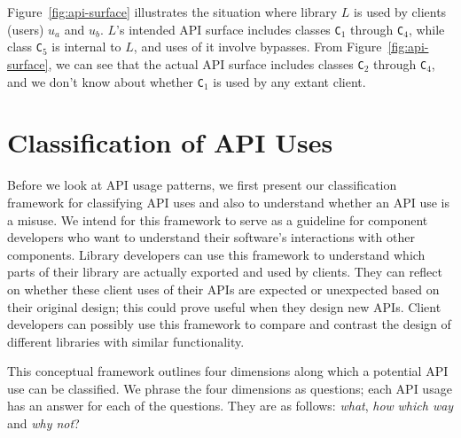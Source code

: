 Figure~\ref{fig:api-surface} illustrates the situation where library
$L$ is used by clients (users) $u_a$ and $u_b$. $L$'s intended API surface
includes classes \texttt{C}$_1$ through \texttt{C}$_4$, while class
\texttt{C}$_5$ is internal to $L$, and uses of it involve bypasses. From Figure~\ref{fig:api-surface},
we can see that the actual API surface includes classes
\texttt{C}$_2$ through \texttt{C}$_4$, and we don't know about whether
\texttt{C}$_1$ is used by any extant client.


\section{Classification of API Uses}
\label{sec:classification}

Before we look at API usage patterns, we first present our classification framework for classifying API uses and also to understand whether an API use is a misuse. We intend for this framework to serve as a guideline for component developers who want to understand their software's interactions with other components. Library developers can use this framework to understand which parts of their library are actually exported and used by clients. They can reflect on whether these client uses of their APIs are expected or unexpected based on their original design; this could prove useful when they design new APIs. Client developers can possibly use this framework to compare and contrast the design of different libraries with similar functionality.

This conceptual framework outlines four dimensions along which a potential API use can be classified. We phrase the four dimensions as questions; each API usage has an answer for each of the questions. They are as follows: \emph{what}, \emph{how} \emph{which way} and \emph{why not}?

